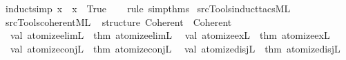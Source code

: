 \begin{isabellebody}
\endisatagproof
{\isafoldproof}%
%
\isadelimproof
\isanewline
%
\endisadelimproof
\isanewline
{}\isamarkupfalse%
\ {\isacharbrackleft}{\kern0pt}induct{\isacharunderscore}{\kern0pt}simp{\isacharbrackright}{\kern0pt}{\isacharcolon}{\kern0pt}\ {\isachardoublequoteopen}x\ {\isacharequal}{\kern0pt}\ x\ {\isasymlongleftrightarrow}\ True{\isachardoublequoteclose}\isanewline
%
\isadelimproof
\ \ %
\endisadelimproof
%
\isatagproof
{}\isamarkupfalse%
\ {\isacharparenleft}{\kern0pt}rule\ simp{\isacharunderscore}{\kern0pt}thms{\isacharparenright}{\kern0pt}%
\endisatagproof
{\isafoldproof}%
%
\isadelimproof
\isanewline
%
\endisadelimproof
\isanewline
{}\isamarkupfalse%
\isanewline
%
\isadelimML
\isanewline
%
\endisadelimML
%
\isatagML
{}\isamarkupfalse%
\ {\isacartoucheopen}{\isachartilde}{\kern0pt}{\isachartilde}{\kern0pt}{\isacharslash}{\kern0pt}src{\isacharslash}{\kern0pt}Tools{\isacharslash}{\kern0pt}induct{\isacharunderscore}{\kern0pt}tacs{\isachardot}{\kern0pt}ML{\isacartoucheclose}%
\endisatagML
{\isafoldML}%
%
\isadelimML
%
\endisadelimML
%
\isadelimdocument
%
\endisadelimdocument
%
\isatagdocument
%
\isamarkuptrue%
%
\endisatagdocument
{\isafolddocument}%
%
\isadelimdocument
%
\endisadelimdocument
%
\isadelimML
%
\endisadelimML
%
\isatagML
{}\isamarkupfalse%
\ {\isacartoucheopen}{\isachartilde}{\kern0pt}{\isachartilde}{\kern0pt}{\isacharslash}{\kern0pt}src{\isacharslash}{\kern0pt}Tools{\isacharslash}{\kern0pt}coherent{\isachardot}{\kern0pt}ML{\isacartoucheclose}\isanewline
{}\isamarkupfalse%
\ {\isacartoucheopen}\isanewline
structure\ Coherent\ {\isacharequal}{\kern0pt}\ Coherent\isanewline
{\isacharparenleft}{\kern0pt}\isanewline
\ \ val\ atomize{\isacharunderscore}{\kern0pt}elimL\ {\isacharequal}{\kern0pt}\ {\isacharat}{\kern0pt}{\isacharbraceleft}{\kern0pt}thm\ atomize{\isacharunderscore}{\kern0pt}elimL{\isacharbraceright}{\kern0pt}{\isacharsemicolon}{\kern0pt}\isanewline
\ \ val\ atomize{\isacharunderscore}{\kern0pt}exL\ {\isacharequal}{\kern0pt}\ {\isacharat}{\kern0pt}{\isacharbraceleft}{\kern0pt}thm\ atomize{\isacharunderscore}{\kern0pt}exL{\isacharbraceright}{\kern0pt}{\isacharsemicolon}{\kern0pt}\isanewline
\ \ val\ atomize{\isacharunderscore}{\kern0pt}conjL\ {\isacharequal}{\kern0pt}\ {\isacharat}{\kern0pt}{\isacharbraceleft}{\kern0pt}thm\ atomize{\isacharunderscore}{\kern0pt}conjL{\isacharbraceright}{\kern0pt}{\isacharsemicolon}{\kern0pt}\isanewline
\ \ val\ atomize{\isacharunderscore}{\kern0pt}disjL\ {\isacharequal}{\kern0pt}\ {\isacharat}{\kern0pt}{\isacharbraceleft}{\kern0pt}thm\ atomize{\isacharunderscore}{\kern0pt}disjL{\isacharbraceright}{\kern0pt}{\isacharsemicolon}{\kern0pt}\isanewline

\end{isabellebody}
